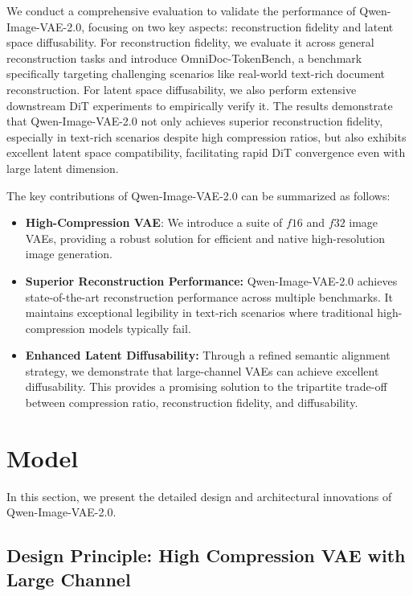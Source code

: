 \documentclass{llmxive}
\begin{document}
We conduct a comprehensive evaluation to validate the performance of Qwen-Image-VAE-2.0, focusing on two key aspects: reconstruction fidelity and latent space diffusability. For reconstruction fidelity, we evaluate it across general reconstruction tasks and introduce OmniDoc-TokenBench, a benchmark specifically targeting challenging scenarios like real-world text-rich document reconstruction. For latent space diffusability, we also perform extensive downstream DiT experiments to empirically verify it. The results demonstrate that Qwen-Image-VAE-2.0 not only achieves superior reconstruction fidelity, especially in text-rich scenarios despite high compression ratios, but also exhibits excellent latent space compatibility, facilitating rapid DiT convergence even with large latent dimension.

The key contributions of Qwen-Image-VAE-2.0 can be summarized as follows:
\begin{itemize}
\item \textbf{High-Compression VAE}: We introduce a suite of $f16$ and $f32$ image VAEs, providing a robust solution for efficient and native high-resolution image generation.
\item \textbf{Superior Reconstruction Performance:} Qwen-Image-VAE-2.0 achieves state-of-the-art reconstruction performance across multiple benchmarks. It maintains exceptional legibility in text-rich scenarios where traditional high-compression models typically fail.
\item \textbf{Enhanced Latent Diffusability:} Through a refined semantic alignment strategy, we demonstrate that large-channel VAEs can achieve excellent diffusability. This provides a promising solution to the tripartite trade-off between compression ratio, reconstruction fidelity, and diffusability.
\end{itemize}


\section{Model}

In this section, we present the detailed design and architectural innovations of Qwen-Image-VAE-2.0. 



\subsection{Design Principle: High Compression VAE with Large Channel}
\end{document}
